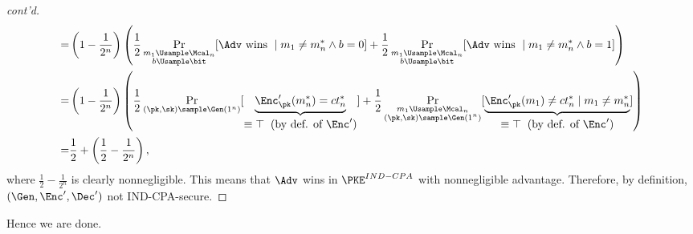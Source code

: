 \begin{answer}[iv]
\begin{proof}[cont'd]
\begin{align*}
            =& \left(1-\frac{1}{2^n}\right)\left(\frac{1}{2}\Pr_{\substack{m_1\Usample \Mcal_n\\b\Usample\bit}}[\Adv \textrm{ wins } \mid m_1\neq m^\ast_n\land b=0] + \frac{1}{2} \Pr_{\substack{m_1\Usample \Mcal_n\\b\Usample\bit}}[\Adv \textrm{ wins } \mid m_1\neq m^\ast_n\land b=1]\right)\\
            =& \left(1-\frac{1}{2^n}\right)\left(\frac{1}{2}\Pr_{(\pk,\sk)\sample\Gen(1^n)}[\underbrace{\Enc'_\pk(m^\ast_n)={ct}^\ast_n}_{\begin{gathered}\equiv\top \;\; (\textrm{by def. of } \Enc')\end{gathered}}] + \frac{1}{2} \Pr_{\substack{m_1\Usample \Mcal_n\\(\pk,\sk)\sample\Gen(1^n)}}[\underbrace{\Enc'_\pk(m_1)\neq {ct}^\ast_n \mid m_1\neq m^\ast_n}_{\begin{gathered}\equiv\top \;\; (\textrm{by def. of } \Enc')\end{gathered}}]\right)\\
            =& \frac{1}{2}+\left(\frac{1}{2}-\frac{1}{2^n}\right),
        \end{align*}
        where $\frac{1}{2}-\frac{1}{2^n}$ is clearly nonnegligible. This means that $\Adv$ wins in $\PKE^{IND-CPA}$ with nonnegligible advantage. Therefore, by definition, $(\Gen, \Enc', \Dec')$ not IND-CPA-secure. 
    \end{proof}

    Hence we are done.
\end{answer}